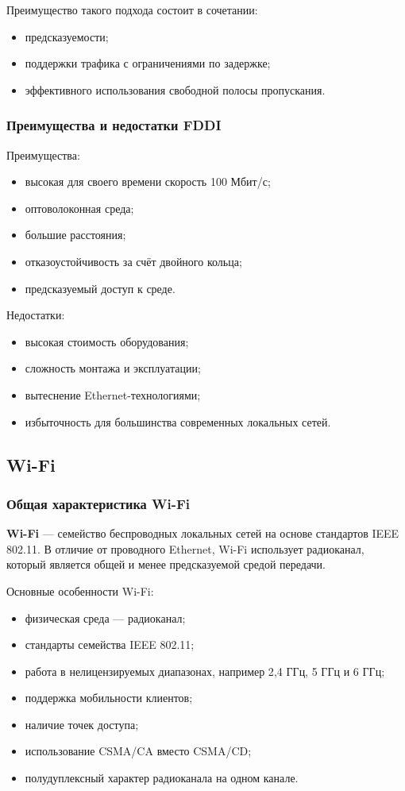 \documentclass[12pt,a4paper]{article}
\begin{document}
Преимущество такого подхода состоит в сочетании:
\begin{itemize}
    \item предсказуемости;
    \item поддержки трафика с ограничениями по задержке;
    \item эффективного использования свободной полосы пропускания.
\end{itemize}

\subsubsection{Преимущества и недостатки FDDI}

Преимущества:
\begin{itemize}
    \item высокая для своего времени скорость 100 Мбит/с;
    \item оптоволоконная среда;
    \item большие расстояния;
    \item отказоустойчивость за счёт двойного кольца;
    \item предсказуемый доступ к среде.
\end{itemize}

Недостатки:
\begin{itemize}
    \item высокая стоимость оборудования;
    \item сложность монтажа и эксплуатации;
    \item вытеснение Ethernet-технологиями;
    \item избыточность для большинства современных локальных сетей.
\end{itemize}

\subsection{Wi-Fi}

\subsubsection{Общая характеристика Wi-Fi}

\textbf{Wi-Fi} --- семейство беспроводных локальных сетей на основе стандартов IEEE 802.11. В отличие от проводного Ethernet, Wi-Fi использует радиоканал, который является общей и менее предсказуемой средой передачи.

Основные особенности Wi-Fi:
\begin{itemize}
    \item физическая среда --- радиоканал;
    \item стандарты семейства IEEE 802.11;
    \item работа в нелицензируемых диапазонах, например 2{,}4 ГГц, 5 ГГц и 6 ГГц;
    \item поддержка мобильности клиентов;
    \item наличие точек доступа;
    \item использование CSMA/CA вместо CSMA/CD;
    \item полудуплексный характер радиоканала на одном канале.
\end{itemize}
\end{document}
